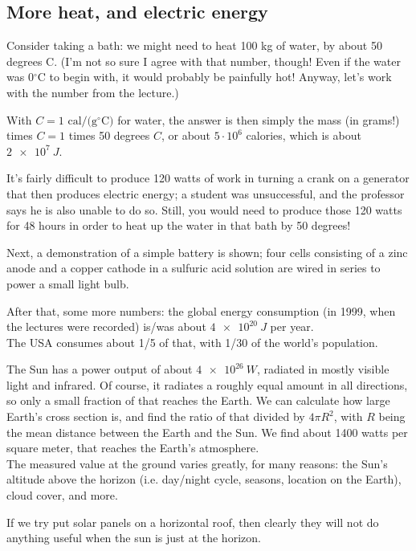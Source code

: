 \documentclass[8.01x]{subfiles}
\begin{document}
\subsection{More heat, and electric energy}

Consider taking a bath: we might need to heat 100 kg of water, by about 50 degrees C. (I'm not so sure I agree with that number, though! Even if the water was $0 {}^\circ$C to begin with, it would probably be painfully hot! Anyway, let's work with the number from the lecture.)

With $C = 1 \text{ cal/(g} {}^\circ \text{C})$ for water, the answer is then simply the mass (in grams!) times $C = 1$ times 50 degrees $C$, or about $5 \cdot 10^6$ calories, which is about $\SI{2e7}{J}$.

It's fairly difficult to produce 120 watts of work in turning a crank on a generator that then produces electric energy; a student was unsuccessful, and the professor says he is also unable to do so. Still, you would need to produce those 120 watts for 48 hours in order to heat up the water in that bath by 50 degrees!

Next, a demonstration of a simple battery is shown; four cells consisting of a zinc anode and a copper cathode in a sulfuric acid solution are wired in series to power a small light bulb.

After that, some more numbers: the global energy consumption (in 1999, when the lectures were recorded) is/was about $\SI{4e20}{J}$ per year.\\
The USA consumes about 1/5 of that, with 1/30 of the world's population.

The Sun has a power output of about $\SI{4e26}{W}$, radiated in mostly visible light and infrared. Of course, it radiates a roughly equal amount in all directions, so only a small fraction of that reaches the Earth. We can calculate how large Earth's cross section is, and find the ratio of that divided by $4 \pi R^2$, with $R$ being the mean distance between the Earth and the Sun. We find about 1400 watts per square meter, that reaches the Earth's atmosphere.\\
The measured value at the ground varies greatly, for many reasons: the Sun's altitude above the horizon (i.e. day/night cycle, seasons, location on the Earth), cloud cover, and more.

If we try put solar panels on a horizontal roof, then clearly they will not do anything useful when the sun is just at the horizon.
\end{document}
